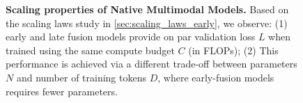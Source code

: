 
\begin{figure}[t!]
    \centering
    \captionsetup{type=figure}
    \begin{subfigure}[t]{0.48\linewidth}
        
    \end{subfigure}
    \hfill
    \begin{subfigure}[t]{0.48\linewidth}
        
    \end{subfigure}
    \vspace{-3mm}
    \caption{\textbf{Scaling properties of Native Multimodal Models.} Based on
    the scaling laws study in \cref{sec:scaling_laws_early}, we observe: (1)
    early and late fusion models provide on par validation loss $L$ when trained
    using the same compute budget $C$ (in FLOPs); (2) This performance is
    achieved via a different trade-off between parameters $N$ and number of
    training tokens $D$, where early-fusion models requires fewer parameters.
    }
    \label{fig:teaser}
\end{figure}
